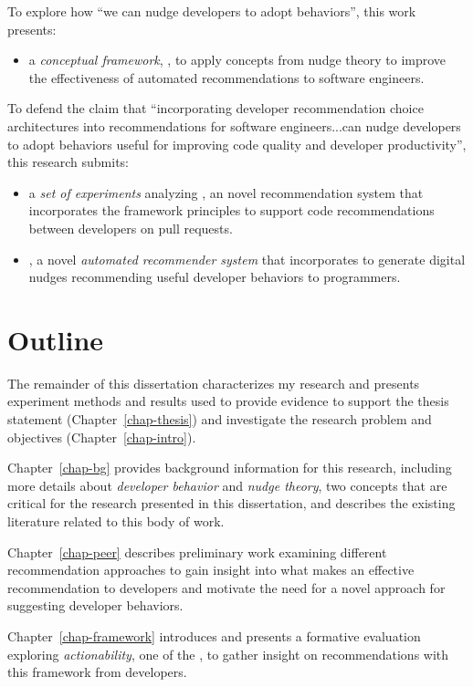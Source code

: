To explore how ``we can nudge developers to adopt behaviors'', this work presents:

\begin{itemize}
    \item a \textit{conceptual framework}, \FRAMEWORK, to apply concepts from nudge theory to improve the effectiveness of automated recommendations to software engineers.
\end{itemize}

To defend the claim that ``incorporating developer recommendation choice architectures into recommendations for software engineers...can nudge developers to adopt behaviors useful for improving code quality and developer productivity'', this research submits:
\begin{itemize}[itemsep=-1ex,partopsep=1ex,parsep=1ex]
     \item a \textit{set of experiments} analyzing \suggs, an novel recommendation system that incorporates the framework principles to support code recommendations between developers on pull requests.
    \item \tooltwo, a novel \textit{automated recommender system} that incorporates \framework to generate digital nudges recommending useful developer behaviors to programmers.
\end{itemize} 


\section{Outline}

The remainder of this dissertation characterizes my research and presents experiment methods and results used to provide evidence to support the thesis statement (Chapter~\ref{chap-thesis}) and investigate the research problem and objectives (Chapter~\ref{chap-intro}).

Chapter~\ref{chap-bg} provides background information for this research, including more details about \textit{developer behavior} and \textit{nudge theory}, two concepts that are critical for the research presented in this dissertation, and describes the existing literature related to this body of work.

Chapter~\ref{chap-peer} describes preliminary work examining different recommendation approaches to gain insight into what makes an effective recommendation to developers and motivate the need for a novel approach for suggesting developer behaviors.

Chapter~\ref{chap-framework} introduces \framework and presents a formative evaluation exploring \textit{actionability}, one of the \framework, to gather insight on recommendations with this framework from developers.

